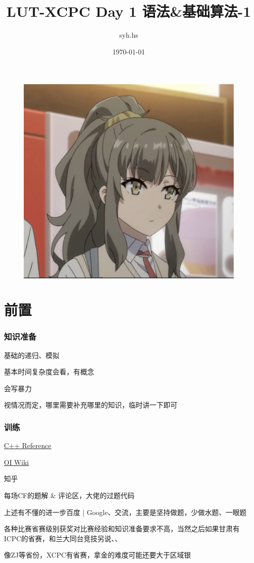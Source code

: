 \documentclass{beamer}
\author{syh.hs}
\title{LUT-XCPC Day 1 语法\&基础算法-1}
\date{\today}
\institute{兰州理工大学}
\begin{document}

  

  \begin{frame}[plain]
    \maketitle
    \begin{figure}[htbp] %
    \centering %
    \includegraphics[width=0.3\textheight,height=0.2\textwidth]{new- 2.jpg} %
    \end{figure}
  \end{frame}

  
  \section{前置}

  \begin{frame}
    \frametitle{知识准备}
    基础的递归、模拟

    基本时间复杂度会看，有概念

    会写暴力

    视情况而定，哪里需要补充哪里的知识，临时讲一下即可
  \end{frame}
  \begin{frame}
    \frametitle{训练}
    \href{https://en.cppreference.com/w/}{C++ Reference}

    \href{https://oi-wiki.org/}{OI Wiki}

    知乎

    每场CF的题解 \& 评论区，大佬的过题代码

    \vspace*{1\baselineskip}
    
    上述有不懂的进一步百度 | Google、交流，主要是坚持做题，少做水题、一眼题
    
    \vspace*{1\baselineskip}
    
    各种比赛省赛级别获奖对比赛经验和知识准备要求不高，当然之后如果甘肃有ICPC的省赛，和兰大同台竞技另说、、
    
    \vspace*{1\baselineskip}

    像ZJ等省份，XCPC有省赛，拿金的难度可能还要大于区域银
  \end{frame}
\end{document}
